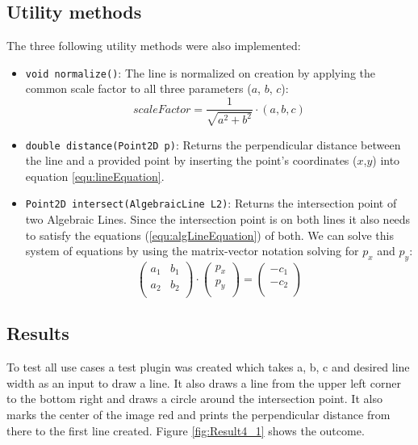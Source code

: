 \subsection{Utility methods}
The three following utility methods were also implemented:
\begin{itemize}
	\item \texttt{void normalize()}: The line is normalized on creation by applying the common scale factor to all three parameters ($a$, $b$, $c$):
	\begin{equation}
		scaleFactor = \frac{1}{\sqrt{a^2 + b^2}} \cdot (a,b,c)
	\end{equation}
	\item \texttt{double distance(Point2D p)}: Returns the perpendicular distance between the line and a provided point by inserting the point's coordinates ($x$,$y$) into equation \ref{equ:lineEquation}.
	\item \texttt{Point2D intersect(AlgebraicLine L2)}: Returns the intersection point of two Algebraic Lines. Since the intersection point is on both lines it also needs to satisfy the equations (\ref{equ:algLineEquation}) of both. We can solve this system of equations by using the matrix-vector notation solving for $p_x$ and $p_y$:
	\begin{equation}
		\begin{pmatrix}
		a_{1} & b_1  \\
		a_{2} & b_2 \\
		\end{pmatrix}
		\cdot
		\begin{pmatrix}
			p_x \\
			p_y \\
		\end{pmatrix}
		=
		\begin{pmatrix}
			-c_1 \\
			-c_2 \\
		\end{pmatrix}
	\end{equation}
\end{itemize}

\subsection{Results}
To test all use cases a test plugin was created which takes a, b, c and desired line width as an input to draw a line. It also draws a line from the upper left corner to the bottom right and draws a circle around the intersection point. It also marks the center of the image red and prints the perpendicular distance from there to the first line created. Figure \ref{fig:Result4_1} shows the outcome.

